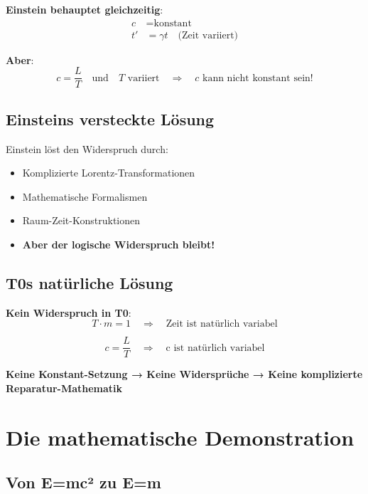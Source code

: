 \documentclass[12pt,a4paper]{article}
\newcommand{\Tfield}{T}
\begin{document}
	\textbf{Einstein behauptet gleichzeitig}:
	\begin{align}
		c &= \text{konstant} \\
		t' &= \gamma t \quad \text{(Zeit variiert)}
	\end{align}
	
	\textbf{Aber}:
	\begin{equation}
		c = \frac{L}{T} \quad \text{und} \quad T \text{ variiert} \quad \Rightarrow \quad c \text{ kann nicht konstant sein!}
	\end{equation}
	
	\subsection{Einsteins versteckte Lösung}
	
	Einstein löst den Widerspruch durch:
	\begin{itemize}
		\item Komplizierte Lorentz-Transformationen
		\item Mathematische Formalismen
		\item Raum-Zeit-Konstruktionen
		\item \textbf{Aber der logische Widerspruch bleibt!}
	\end{itemize}
	
	\subsection{T0s natürliche Lösung}
	
	\textbf{Kein Widerspruch in T0}:
	\begin{equation}
		\Tfield \cdot m = 1 \quad \Rightarrow \quad \text{Zeit ist natürlich variabel}
	\end{equation}
	
	\begin{equation}
		c = \frac{L}{T} \quad \Rightarrow \quad \text{c ist natürlich variabel}
	\end{equation}
	
	\textbf{Keine Konstant-Setzung → Keine Widersprüche → Keine komplizierte Reparatur-Mathematik}
	
	\section{Die mathematische Demonstration}
	
	\subsection{Von E=mc² zu E=m}
	
\end{document}

